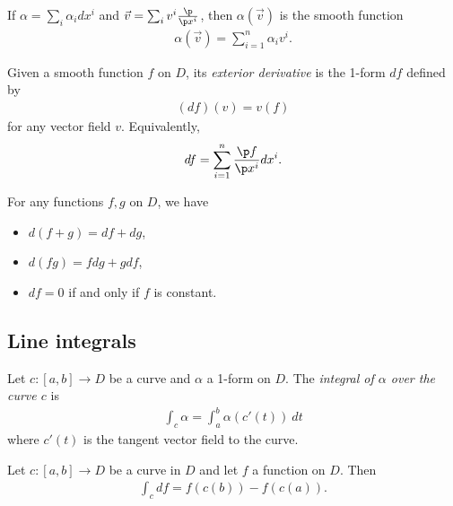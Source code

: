 \documentclass{article}
\begin{document}
\begin{lemma}
    If $\alpha=\sum_i\alpha_i dx^i$ and $\vec v = \sum_i v^i\frac{\p }{\p x^i}$, then $\alpha(\vec v)$
    is the smooth function
    \begin{align*}
        \alpha(\vec v) = \sum_{i=1}^n \alpha_i v^i.    
    \end{align*}
\end{lemma}

\begin{definition}
    Given a smooth function $f$ on $D$, its \emph{exterior derivative} is the 1-form $df$ defined by
    \begin{align*}
        (df)(v) = v(f)
    \end{align*}
    for any vector field $v$. Equivalently,
    \begin{align*}
        df=\sum_{i=1}^n \frac{\p f}{\p x^i}dx^i.
    \end{align*}
\end{definition}

\begin{proposition}
    For any functions $f,g$ on $D$, we have 
    \begin{itemize}
        \item $d(f+g)=df + dg$,
        \item $d(fg) =fdg + gdf$,
        \item $df=0$ if and only if $f$ is constant.
    \end{itemize}
\end{proposition}

\subsection{Line integrals}

\begin{definition}
    Let $c:[a,b]\to D$ be a curve and $\alpha$ a 1-form on $D$. The \emph{integral of $\alpha$ over
    the curve $c$} is 
    \begin{align*}
        \int_c \alpha = \int_a^b \alpha(c'(t))\:dt
    \end{align*}
    where $c'(t)$ is the tangent vector field to the curve.
\end{definition}

\begin{proposition}
    Let $c:[a,b]\to D$ be a curve in $D$ and let $f$ a function on $D$. Then
    \begin{align*}
        \int_c df = f(c(b)) - f(c(a)).
    \end{align*}
\end{proposition}
\end{document}

